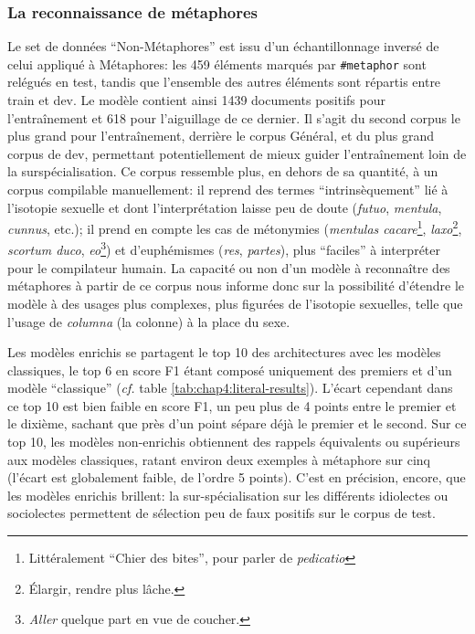 
\subsubsection{La reconnaissance de métaphores}

Le set de données ``Non-Métaphores'' est issu d'un échantillonnage inversé de celui appliqué à Métaphores: les 459 éléments marqués par \texttt{\#metaphor} sont relégués en test, tandis que l'ensemble des autres éléments sont répartis entre train et dev. Le modèle contient ainsi 1439 documents positifs pour l'entraînement et 618 pour l'aiguillage de ce dernier. Il s'agit du second corpus le plus grand pour l'entraînement, derrière le corpus Général, et du plus grand corpus de dev, permettant potentiellement de mieux guider l'entraînement loin de la surspécialisation. Ce corpus ressemble plus, en dehors de sa quantité, à un corpus compilable manuellement: il reprend des termes ``intrinsèquement'' lié à l'isotopie sexuelle et dont l'interprétation laisse peu de doute (\textit{futuo}, \textit{mentula}, \textit{cunnus}, etc.); il prend en compte les cas de métonymies (\textit{mentulas cacare}\footnote{Littéralement ``Chier des bites'', pour parler de \textit{pedicatio}}, \textit{laxo}\footnote{Élargir, rendre plus lâche.}, \textit{scortum duco}, \textit{eo}\footnote{\textit{Aller} quelque part en vue de coucher.}) et d'euphémismes (\textit{res}, \textit{partes}), plus ``faciles'' à interpréter pour le compilateur humain. La capacité ou non d'un modèle à reconnaître des métaphores à partir de ce corpus nous informe donc sur la possibilité d'étendre le modèle à des usages plus complexes, plus figurées de l'isotopie sexuelles, telle que l'usage de \textit{columna} (la colonne) à la place du sexe.

Les modèles enrichis se partagent le top 10 des architectures avec les modèles classiques, le top 6 en score F1 étant composé uniquement des premiers et d'un modèle ``classique'' (\textit{cf.} table \ref{tab:chap4:literal-results}). L'écart cependant dans ce top 10 est bien faible en score F1, un peu plus de 4 points entre le premier et le dixième, sachant que près d'un point sépare déjà le premier et le second. Sur ce top 10, les modèles non-enrichis obtiennent des rappels équivalents ou supérieurs aux modèles classiques, ratant environ deux exemples à métaphore sur cinq (l'écart est globalement faible, de l'ordre 5 points). C'est en précision, encore, que les modèles enrichis brillent: la sur-spécialisation sur les différents idiolectes ou sociolectes permettent de sélection peu de faux positifs sur le corpus de test.

